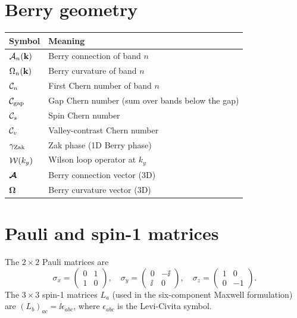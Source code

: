 \section*{Berry geometry}

\begin{center}
\begin{tabular}{ll}
  \toprule
  \textbf{Symbol} & \textbf{Meaning} \\
  \midrule
  $\mathcal{A}_n(\mathbf{k})$ & Berry connection of band $n$ \\
  $\Omega_n(\mathbf{k})$ & Berry curvature of band $n$ \\
  $\mathcal{C}_n$ & First Chern number of band $n$ \\
  $\mathcal{C}_{\mathrm{gap}}$ & Gap Chern number (sum over bands below the gap) \\
  $\mathcal{C}_s$ & Spin Chern number \\
  $\mathcal{C}_v$ & Valley-contrast Chern number \\
  $\gamma_{\mathrm{Zak}}$ & Zak phase (1D Berry phase) \\
  $\mathcal{W}(k_y)$ & Wilson loop operator at $k_y$ \\
  $\boldsymbol{\mathcal{A}}$ & Berry connection vector (3D) \\
  $\boldsymbol{\Omega}$ & Berry curvature vector (3D) \\
  \bottomrule
\end{tabular}
\end{center}

\section*{Pauli and spin-1 matrices}

The $2\times 2$ Pauli matrices are
\begin{equation*}
  \sigma_x=\begin{pmatrix}0&1\\1&0\end{pmatrix},\quad
  \sigma_y=\begin{pmatrix}0&-\ii\\\ii&0\end{pmatrix},\quad
  \sigma_z=\begin{pmatrix}1&0\\0&-1\end{pmatrix}.
\end{equation*}
The $3\times 3$ spin-1 matrices $L_a$ (used in the six-component
Maxwell formulation) are $(L_b)_{ac}=\ii\epsilon_{abc}$, where
$\epsilon_{abc}$ is the Levi-Civita symbol.


